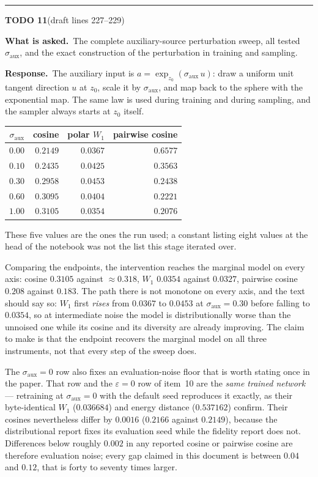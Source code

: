 \documentclass[11pt]{article}
\newenvironment{todoitem}[2]{%
  \par\medskip\noindent\rule{\textwidth}{0.7pt}\par\nobreak\smallskip
  \noindent\textbf{\large TODO #1}\quad\textnormal{\small(draft #2)}\par\nobreak\smallskip
}{\par\medskip}
\newcommand{\ask}[1]{\noindent\textbf{What is asked.}\ #1\par\smallskip}
\newcommand{\resp}[1]{\noindent\textbf{Response.}\ #1\par}
\begin{document}
\begin{todoitem}{11}{lines 227--229}
\ask{The complete auxiliary-source perturbation sweep, all tested $\sigma_{\mathrm{aux}}$, and
the exact construction of the perturbation in training and sampling.}

\resp{The auxiliary input is $a=\exp_{z_0}(\sigma_{\mathrm{aux}}\,u)$: draw a uniform unit
tangent direction $u$ at $z_0$, scale it by $\sigma_{\mathrm{aux}}$, and map back to the sphere
with the exponential map. The same law is used during training and during sampling, and the
sampler always starts at $z_0$ itself.

\begin{center}
\small
\begin{tabular}{@{}rrrr@{}}
\toprule
$\sigma_{\mathrm{aux}}$ & cosine & polar $W_1$ & pairwise cosine\\
\midrule
$0.00$ & $0.2149$ & $0.0367$ & $0.6577$\\
$0.10$ & $0.2435$ & $0.0425$ & $0.3563$\\
$0.30$ & $0.2958$ & $0.0453$ & $0.2438$\\
$0.60$ & $0.3095$ & $0.0404$ & $0.2221$\\
$1.00$ & $0.3105$ & $0.0354$ & $0.2076$\\
\bottomrule
\end{tabular}
\end{center}

These five values are the ones the run used; a constant listing eight values at the head of the
notebook was not the list this stage iterated over.

Comparing the endpoints, the intervention reaches the marginal model on every axis: cosine
$0.3105$ against $\approx0.318$, $W_1$ $0.0354$ against $0.0327$, pairwise cosine $0.208$ against
$0.183$. The path there is not monotone on every axis, and the text should say so: $W_1$ first
\emph{rises} from $0.0367$ to $0.0453$ at $\sigma_{\mathrm{aux}}=0.30$ before falling to
$0.0354$, so at intermediate noise the model is distributionally worse than the unnoised one
while its cosine and its diversity are already improving. The claim to make is that the endpoint
recovers the marginal model on all three instruments, not that every step of the sweep does.

The $\sigma_{\mathrm{aux}}=0$ row also fixes an evaluation-noise floor that is worth stating once
in the paper. That row and the $\varepsilon=0$ row of item~10 are the \emph{same trained network}
--- retraining at $\sigma_{\mathrm{aux}}=0$ with the default seed reproduces it exactly, as their
byte-identical $W_1$ ($0.036684$) and energy distance ($0.537162$) confirm. Their cosines
nevertheless differ by $0.0016$ ($0.2166$ against $0.2149$), because the distributional report
fixes its evaluation seed while the fidelity report does not. Differences below roughly $0.002$
in any reported cosine or pairwise cosine are therefore evaluation noise; every gap claimed in
this document is between $0.04$ and $0.12$, that is forty to seventy times larger.}
\end{todoitem}
\end{document}
